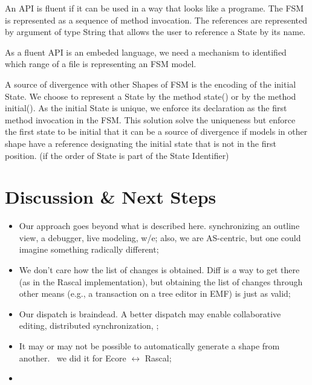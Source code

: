 \documentclass[sigplan]{acmart}
\begin{document}
An API is fluent if it can be used in a way that looks like a programe.
The FSM is represented as a sequence of method invocation.
The references are represented by argument of type String that allows the user to reference a State by its name.

As a fluent API is an embeded language, we need a mechanism to identified which range of a file is representing an FSM model.

A source of divergence with other Shapes of FSM is the encoding of the initial State.
We choose to represent a State by the method state() or by the method initial().
As the initial State is unique, we enforce its declaration as the first method invocation in the FSM. This solution solve the uniqueness but enforce the first state to be initial that it can be a source of divergence if models in other shape have a reference designating the initial state that is not in the first position. (if the order of State is part of the State Identifier)

\section{Discussion \& Next Steps}
\begin{itemize}
	\item Our approach goes beyond what is described here. \eg synchronizing an outline view, a debugger, live modeling, w/e; also, we are AS-centric, but one could imagine something radically different;
	\item We don’t care how the list of changes is obtained. Diff is \emph{a} way to get there (as in the Rascal implementation), but obtaining the list of changes through other means (e.g., a transaction on a tree editor in EMF) is just as valid;
	\item Our dispatch is braindead. A better dispatch may enable collaborative editing, distributed synchronization, \etc;
	\item It may or may not be possible to automatically generate a shape from another. \eg~we did it for Ecore $\leftrightarrow$ Rascal;
	\item \cite{lammel2005mappings}
\end{itemize}

\clearpage
\balance


\end{document}
